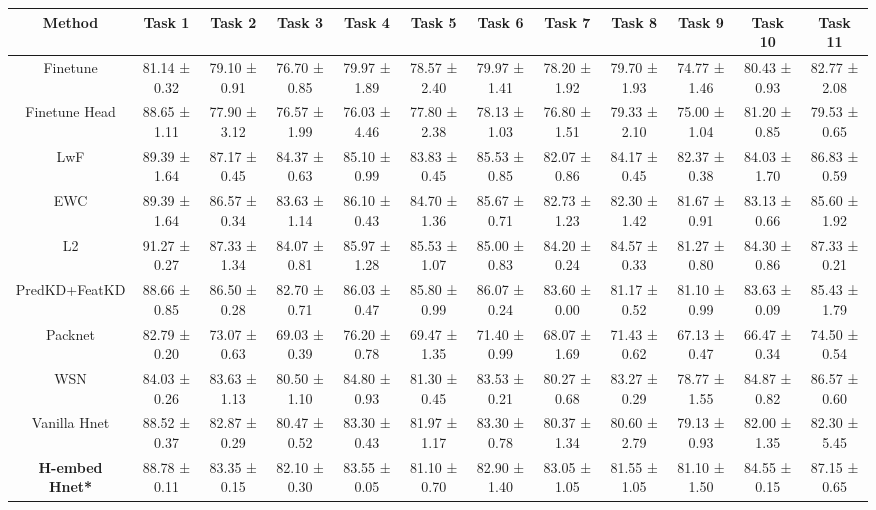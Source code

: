 \begin{sidewaystable}[ht]
\centering
\renewcommand{\arraystretch}{1.6}
\setlength{\tabcolsep}{0.9\tabcolsep}
\begin{adjustbox}{max width=\textwidth}
\begin{tabular}{|c|c|c|c|c|c|c|c|c|c|c|c|}
\hline
Method & Task 1 &  Task 2 & Task 3 & Task 4 & Task 5 & Task 6 & Task 7 & Task 8 & Task 9 & Task 10 & Task 11 \\
\hline
Finetune& 81.14 ± 0.32 & 79.10 ± 0.91 & 76.70 ± 0.85 & 79.97 ± 1.89 & 78.57 ± 2.40 & 79.97 ± 1.41 & 78.20 ± 1.92 & 79.70 ± 1.93 & 74.77 ± 1.46 & 80.43 ± 0.93 & 82.77 ± 2.08  \\
\hline
Finetune Head & 88.65 ± 1.11 & 77.90 ± 3.12 & 76.57 ± 1.99 & 76.03 ± 4.46 & 77.80 ± 2.38 & 78.13 ± 1.03 & 76.80 ± 1.51 & 79.33 ± 2.10 & 75.00 ± 1.04 & 81.20 ± 0.85 & 79.53 ± 0.65 \\
\hline
LwF &89.39 ± 1.64 & 87.17 ± 0.45 & 84.37 ± 0.63 & 85.10 ± 0.99 & 83.83 ± 0.45 & 85.53 ± 0.85 & 82.07 ± 0.86 & 84.17 ± 0.45 & 82.37 ± 0.38 & 84.03 ± 1.70 & 86.83 ± 0.59\\
\hline
EWC & 89.39 ± 1.64 & 86.57 ± 0.34 & 83.63 ± 1.14 & 86.10 ± 0.43 & 84.70 ± 1.36 & 85.67 ± 0.71 & 82.73 ± 1.23 & 82.30 ± 1.42 & 81.67 ± 0.91 & 83.13 ± 0.66 & 85.60 ± 1.92\\
\hline
L2 & 91.27 ± 0.27 & 87.33 ± 1.34 & 84.07 ± 0.81 & 85.97 ± 1.28 & 85.53 ± 1.07 & 85.00 ± 0.83 & 84.20 ± 0.24 & 84.57 ± 0.33 & 81.27 ± 0.80 & 84.30 ± 0.86 & 87.33 ± 0.21 \\
\hline
PredKD+FeatKD & 88.66 ± 0.85 & 86.50 ± 0.28 & 82.70 ± 0.71 & 86.03 ± 0.47 & 85.80 ± 0.99 & 86.07 ± 0.24 & 83.60 ± 0.00 & 81.17 ± 0.52 & 81.10 ± 0.99 & 83.63 ± 0.09 & 85.43 ± 1.79 \\
\hline
Packnet & 82.79 ± 0.20 & 73.07 ± 0.63 & 69.03 ± 0.39 & 76.20 ± 0.78 & 69.47 ± 1.35 & 71.40 ± 0.99 & 68.07 ± 1.69 & 71.43 ± 0.62 & 67.13 ± 0.47 & 66.47 ± 0.34 & 74.50 ± 0.54  \\
\hline
WSN & 84.03 ± 0.26 & 83.63 ± 1.13 & 80.50 ± 1.10 & 84.80 ± 0.93 & 81.30 ± 0.45 & 83.53 ± 0.21 & 80.27 ± 0.68 & 83.27 ± 0.29 & 78.77 ± 1.55 & 84.87 ± 0.82 & 86.57 ± 0.60  \\
\hline
Vanilla Hnet & 88.52 ± 0.37 & 82.87 ± 0.29 & 80.47 ± 0.52 & 83.30 ± 0.43 & 81.97 ± 1.17 & 83.30 ± 0.78 & 80.37 ± 1.34 & 80.60 ± 2.79 & 79.13 ± 0.93 & 82.00 ± 1.35 & 82.30 ± 5.45 \\
\hline
\textbf{H-embed Hnet*} & 88.78 ± 0.11 & 83.35 ± 0.15 & 82.10 ± 0.30 & 83.55 ± 0.05 & 81.10 ± 0.70 & 82.90 ± 1.40 & 83.05 ± 1.05 & 81.55 ± 1.05 & 81.10 ± 1.50 & 84.55 ± 0.15 & 87.15 ± 0.65 \\


\end{tabular}
\end{adjustbox}
\end{sidewaystable}
